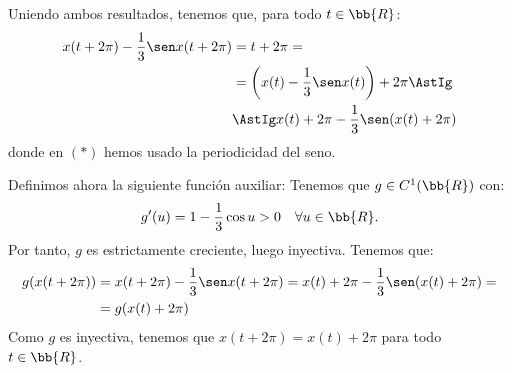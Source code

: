 \documentclass[12pt]{article}
\begin{document}
\begin{ejercicio}
    Uniendo ambos resultados, tenemos que, para todo $t\in \bb{R}$:
    \begin{align*}
        x(t+2\pi)-\dfrac{1}{3}\sen x(t+2\pi) &= t+2\pi
        =\\&=\left(x(t) - \dfrac{1}{3}\sen x(t)\right) + 2\pi
        \AstIg\\&\AstIg x(t)+2\pi - \dfrac{1}{3}\sen (x(t)+2\pi)
    \end{align*}
    donde en $(\ast)$ hemos usado la periodicidad del seno.

    Definimos ahora la siguiente función auxiliar:
    Tenemos que $g\in C^1(\bb{R})$ con:
    \begin{equation*}
        g'(u) = 1-\dfrac{1}{3}\cos u > 0 \quad \forall u\in \bb{R}.
    \end{equation*}
    Por tanto, $g$ es estrictamente creciente, luego inyectiva. Tenemos que:
    \begin{align*}
        g(x(t+2\pi)) &= x(t+2\pi)-\dfrac{1}{3}\sen x(t+2\pi) = x(t)+2\pi-\dfrac{1}{3}\sen (x(t)+2\pi)=\\&=g(x(t)+2\pi)
    \end{align*}
    Como $g$ es inyectiva, tenemos que $x(t+2\pi)=x(t)+2\pi$ para todo $t\in \bb{R}$.
\end{ejercicio}
\end{document}
